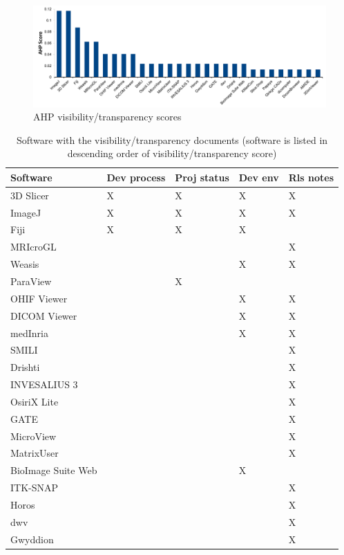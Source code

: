 \documentclass[final, 3p, times, authoryear]{elsarticle}
\begin{document}
\begin{figure}[!ht]
\includegraphics[scale=0.48]{figures/visibility_transparency_scores.pdf}
\caption{AHP visibility/transparency scores}
\label{fg_visibility_transparency_scores}
\end{figure}

\begin{table}[!ht]
\centering
\begin{tabular}{lllll}
\toprule
Software & Dev process & Proj status & Dev env & Rls notes \\ 
\midrule
3D Slicer & X & X & X & X \\
ImageJ & X & X & X & X \\
Fiji & X & X & X &  \\
MRIcroGL &  &  &  & X \\
Weasis &  &  & X & X \\
ParaView &  & X &  &  \\
OHIF Viewer &  &  & X & X \\
DICOM Viewer &  &  & X & X \\
medInria &  &  & X & X \\
SMILI &  &  &  & X \\
Drishti &  &  &  & X \\
INVESALIUS 3 &  &  &  & X \\
OsiriX Lite &  &  &  & X \\
GATE &  &  &  & X \\
MicroView &  &  &  & X \\
MatrixUser &  &  &  & X \\
BioImage Suite Web &  &  & X &  \\
ITK-SNAP &  &  &  & X \\
Horos &  &  &  & X \\
dwv &  &  &  & X \\
Gwyddion &  &  &  & X \\ 
\bottomrule
\end{tabular}
\caption{Software with the visibility/transparency documents (software is listed
in descending order of visibility/transparency score)}
\label{tab_Visibility/Transparency_docs}
\end{table}
\end{document}
